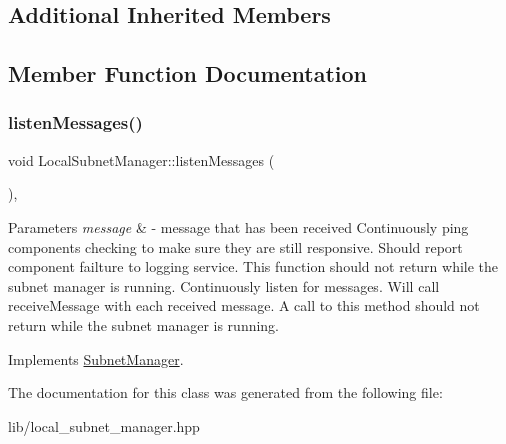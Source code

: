 \subsection*{Additional Inherited Members}


\subsection{Member Function Documentation}
\mbox{\label{classLocalSubnetManager_a8cd2838196edcd75a77f532bce15c2fd}} 
\subsubsection{\texorpdfstring{listen\+Messages()}{listenMessages()}}
{\footnotesize\ttfamily void Local\+Subnet\+Manager\+::listen\+Messages (\begin{DoxyParamCaption}{ }\end{DoxyParamCaption})\hspace{0.3cm}{\ttfamily [inline]}, {\ttfamily [virtual]}}


\begin{DoxyParams}{Parameters}
{\em message} & -\/ message that has been received Continuously ping components checking to make sure they are still responsive. Should report component failture to logging service. This function should not return while the subnet manager is running. Continuously listen for messages. Will call receive\+Message with each received message. A call to this method should not return while the subnet manager is running. \\
\hline
\end{DoxyParams}


Implements \hyperlink{classSubnetManager_a6aed1acaa5e9f18feb7667904675d119}{Subnet\+Manager}.



The documentation for this class was generated from the following file\+:\begin{DoxyCompactItemize}
\item 
lib/local\+\_\+subnet\+\_\+manager.\+hpp\end{DoxyCompactItemize}
